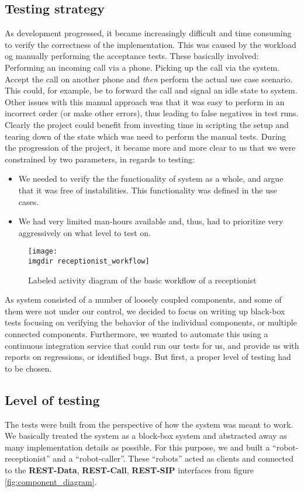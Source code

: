 \subsection{Testing strategy}
\label{sec:background-testing-strategy}
As development progressed, it became increasingly difficult and time consuming to verify the correctness of the implementation. This was caused by the workload og manually performing the acceptance tests. These basically involved: Performing an incoming call via a phone. Picking up the call via the system. Accept the call on another phone and \emph{then} perform the actual use case scenario. This could, for example, be to forward the call and signal an idle state to system. Other issues with this manual approach was that it was easy to perform in an incorrect order (or make other errors), thus leading to false negatives in test runs. Clearly the project could benefit from investing time in scripting the setup and tearing down of the state which was need to perform the manual tests.
During the progression of the project, it became more and more clear to us that we were constrained by two parameters, in regards to testing:
\begin{itemize}
  \item We needed to verify the the functionality of system as a whole, and argue that it was free of instabilities. This functionality was defined in the use cases.
  \item We had very limited man-hours available and, thus, had to prioritize very aggressively on what level to test on.
\end{itemize}
\begin{figure}[ht]
\centering
\texttt{[image: \\imgdir receptionist\_workflow]}
\caption{Labeled activity diagram of the basic workflow of a receptionist}
\label{fig:receptionist_workflow}
\end{figure}
As system consisted of a number of loosely coupled components, and some of them were not under our control, we decided to focus on writing up black-box tests focusing on verifying the behavior of the individual components, or multiple connected components.
Furthermore, we wanted to automate this using a continuous integration service that could run our tests for us, and provide us with reports on regressions, or identified bugs. But first, a proper level of testing had to be chosen.

\subsection{Level of testing}
\label{ssec:level-of-testing}
The tests were built from the perspective of how the system was meant to work. We basically treated the system as a block-box system and abstracted away as many implementation details as possible. For this purpose, we and built a ``robot-receptionist'' and a ``robot-caller''. These ``robots'' acted as clients and connected to the \textbf{REST-Data}, \textbf{REST-Call}, \textbf{REST-SIP} interfaces from figure \ref{fig:component_diagram}.

